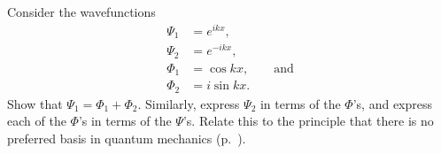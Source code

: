 Consider the wavefunctions
\begin{align*}
  \Psi_1 &= e^{ikx}, \\
  \Psi_2 &= e^{-ikx}, \\
  \Phi_1 &= \cos kx, \qquad \text{and} \\
  \Phi_2 &= i\sin kx.
\end{align*}
Show that $\Psi_1=\Phi_1+\Phi_2$. Similarly,
express $\Psi_2$ in terms of the $\Phi$'s,
and express each of the $\Phi$'s in terms of
the $\Psi$'s. Relate this to the principle that
there is no preferred basis in quantum mechanics (p.~\pageref{no-preferred-basis}).
